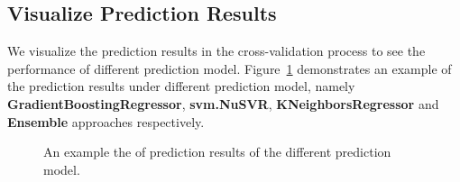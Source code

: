 \documentclass[10pt, oneside]{article}   	%
\begin{document}
\subsection{Visualize Prediction Results}
We visualize the prediction results in the cross-validation process to see the performance of different prediction model. Figure~\ref{fig:predict_results} demonstrates an example of the prediction results under different prediction model, namely \textbf{GradientBoostingRegressor}, \textbf{svm.NuSVR}, \textbf{KNeighborsRegressor} and \textbf{Ensemble} approaches respectively.

\begin{figure}[h]
\centering
{}
\caption{
An example the of prediction results of the different prediction model.}
\label{fig:predict_results}
\end{figure}
\end{document}

